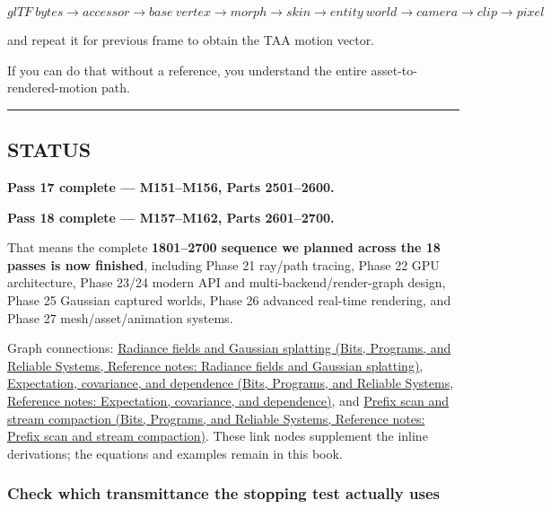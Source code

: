 \[
\boxed{
glTF\ bytes
\rightarrow
accessor
\rightarrow
base\ vertex
\rightarrow
morph
\rightarrow
skin
\rightarrow
entity\ world
\rightarrow
camera
\rightarrow
clip
\rightarrow
pixel
}
\]

and repeat it for previous frame to obtain the TAA motion vector.

If you can do that without a reference, you understand the entire asset-to-rendered-motion path.

\begin{center}\rule{0.5\linewidth}{0.5pt}\end{center}

\subsection{STATUS}\label{04-visual-computing-ii-ch041-status}

\textbf{Pass 17 complete --- M151--M156, Parts 2501--2600.}

\textbf{Pass 18 complete --- M157--M162, Parts 2601--2700.}

That means the complete \textbf{1801--2700 sequence we planned across the 18 passes is now finished}, including Phase 21 ray/path tracing, Phase 22 GPU architecture, Phase 23/24 modern API and multi-backend/render-graph design, Phase 25 Gaussian captured worlds, Phase 26 advanced real-time rendering, and Phase 27 mesh/asset/animation systems.

Graph connections: \href{../01-Bits-Programs-and-Reliable-Systems/main.pdf\#nameddest=appendix-c5b332e400e7}{Radiance fields and Gaussian splatting (Bits, Programs, and Reliable Systems, Reference notes: Radiance fields and Gaussian splatting)}, \href{../01-Bits-Programs-and-Reliable-Systems/main.pdf\#nameddest=appendix-54c383df9992}{Expectation, covariance, and dependence (Bits, Programs, and Reliable Systems, Reference notes: Expectation, covariance, and dependence)}, and \href{../01-Bits-Programs-and-Reliable-Systems/main.pdf\#nameddest=appendix-f2ee4d086415}{Prefix scan and stream compaction (Bits, Programs, and Reliable Systems, Reference notes: Prefix scan and stream compaction)}. These link nodes supplement the inline derivations; the equations and examples remain in this book.

\subsubsection{Check which transmittance the stopping test actually uses}\label{04-visual-computing-ii-ch041-check-which-transmittance-the-stopping-test-actually-uses}

